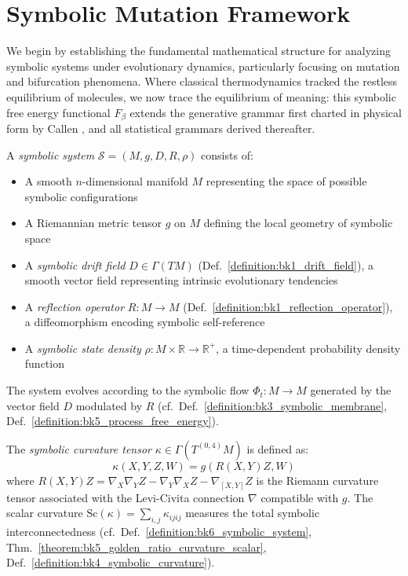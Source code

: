 \section{Symbolic Mutation Framework}
\label{sec:bk6_symbolic_mutation_framework}
We begin by establishing the fundamental mathematical structure for analyzing symbolic systems under evolutionary dynamics, particularly focusing on mutation and bifurcation phenomena. Where classical thermodynamics tracked the restless equilibrium of molecules, we now trace the equilibrium of meaning: this symbolic free energy functional $F_\beta$ extends the generative grammar first charted in physical form by Callen \cite{callen1985thermodynamics}, and all statistical grammars derived thereafter.
\begin{definition}
\label{definition:bk6_symbolic_system}
A \emph{symbolic system} $\mathcal{S} = (M, g, D, R, \rho)$ consists of:
\begin{itemize}
\item A smooth $n$-dimensional manifold $M$ representing the space of possible symbolic configurations
\item A Riemannian metric tensor $g$ on $M$ defining the local geometry of symbolic space
\item A \emph{symbolic drift field} $D \in \Gamma(TM)$ (Def.~\ref{definition:bk1_drift_field}), a smooth vector field representing intrinsic evolutionary tendencies
\item A \emph{reflection operator} $R: M \rightarrow M$ (Def.~\ref{definition:bk1_reflection_operator}), a diffeomorphism encoding symbolic self-reference
\item A \emph{symbolic state density} $\rho: M \times \mathbb{R} \rightarrow \mathbb{R}^+$, a time-dependent probability density function
\end{itemize}
The system evolves according to the symbolic flow $\Phi_t: M \rightarrow M$ generated by the vector field $D$ modulated by $R$ (cf.~Def.~\ref{definition:bk3_symbolic_membrane}, Def.~\ref{definition:bk5_process_free_energy}).
\end{definition}
\begin{definition}
\label{definition:bk6_symbolic_curvature_tensor}
The \emph{symbolic curvature tensor} $\kappa \in \Gamma(T^{(0,4)}M)$ is defined as:
\begin{equation}
\kappa(X,Y,Z,W) = g(R(X,Y)Z, W)
\end{equation}
where $R(X,Y)Z = \nabla_X \nabla_Y Z - \nabla_Y \nabla_X Z - \nabla_{[X,Y]}Z$ is the Riemann curvature tensor associated with the Levi-Civita connection $\nabla$ compatible with $g$. The scalar curvature $\text{Sc}(\kappa) = \sum_{i,j} \kappa_{ijij}$ measures the total symbolic interconnectedness (cf.~Def.~\ref{definition:bk6_symbolic_system}, Thm.~\ref{theorem:bk5_golden_ratio_curvature_scalar}, Def.~\ref{definition:bk4_symbolic_curvature}).
\end{definition}
